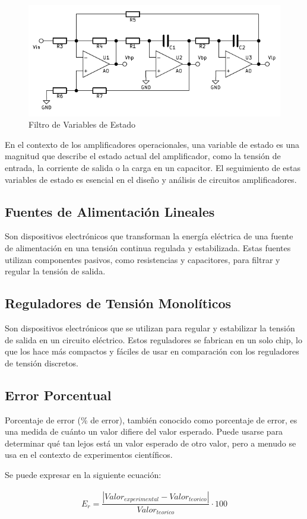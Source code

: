         \begin{figure}[H]
              \centering
              \includegraphics[width=12cm]{Imagenes/var_estado.png}
              \caption{Filtro de Variables de Estado}
              \label{fig:var_estado0}
        \end{figure}

        En el contexto de los amplificadores operacionales, una variable de estado es una magnitud que describe el estado actual del amplificador, como la tensión de entrada, la corriente de salida o la carga en un capacitor. El seguimiento de estas variables de estado es esencial en el diseño y análisis de circuitos amplificadores.

    \subsection{Fuentes de Alimentación Lineales}

        Son dispositivos electrónicos que transforman la energía eléctrica de una fuente de alimentación en una tensión continua regulada y estabilizada. Estas fuentes utilizan componentes pasivos, como resistencias y capacitores, para filtrar y regular la tensión de salida.

    \subsection{Reguladores de Tensión Monolíticos}

        Son dispositivos electrónicos que se utilizan para regular y estabilizar la tensión de salida en un circuito eléctrico. Estos reguladores se fabrican en un solo chip, lo que los hace más compactos y fáciles de usar en comparación con los reguladores de tensión discretos.

    \subsection{Error Porcentual}

    Porcentaje de error (\% de error), también conocido como porcentaje de error, es una medida de cuánto un valor difiere del valor esperado. Puede usarse para determinar qué tan lejos está un valor esperado de otro valor, pero a menudo se usa en el contexto de experimentos científicos.
    
    Se puede expresar en la siguiente ecuación:
    
    \begin{gather}
        E_r =\dfrac{|Valor_{experimental}-Valor_{teorico}|}{Valor_{teorico}} \cdot  100
        \label{eqn:error}
    \end{gather}
                 

\newpage
